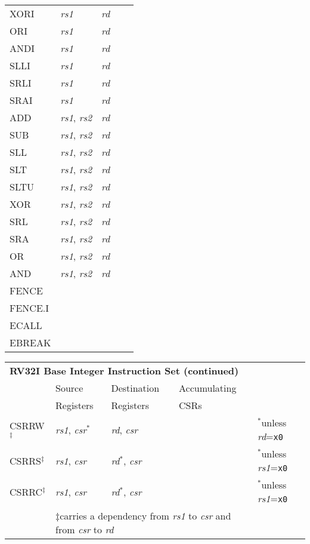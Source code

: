 \begin{tabular}{p{3cm}|p{3cm}|p{2cm}|p{4cm}|p{4cm}}
   \cline{2-4}
   XORI & {\em rs1} & {\em rd} &   & \\
   \cline{2-4}
   ORI & {\em rs1} & {\em rd} &   & \\
   \cline{2-4}
   ANDI & {\em rs1} & {\em rd} &   & \\
   \cline{2-4}
   SLLI & {\em rs1} & {\em rd} &   & \\
   \cline{2-4}
   SRLI & {\em rs1} & {\em rd} &   & \\
   \cline{2-4}
   SRAI & {\em rs1} & {\em rd} &   & \\
   \cline{2-4}
   ADD & {\em rs1}, {\em rs2} & {\em rd} &   & \\
   \cline{2-4}
   SUB & {\em rs1}, {\em rs2} & {\em rd} &   & \\
   \cline{2-4}
   SLL & {\em rs1}, {\em rs2} & {\em rd} &   & \\
   \cline{2-4}
   SLT & {\em rs1}, {\em rs2} & {\em rd} &   & \\
   \cline{2-4}
   SLTU & {\em rs1}, {\em rs2} & {\em rd} &   & \\
   \cline{2-4}
   XOR & {\em rs1}, {\em rs2} & {\em rd} &   & \\
   \cline{2-4}
   SRL & {\em rs1}, {\em rs2} & {\em rd} &   & \\
   \cline{2-4}
   SRA & {\em rs1}, {\em rs2} & {\em rd} &   & \\
   \cline{2-4}
   OR & {\em rs1}, {\em rs2} & {\em rd} &   & \\
   \cline{2-4}
   AND & {\em rs1}, {\em rs2} & {\em rd} &   & \\
   \cline{2-4}
   FENCE &  &  &   & \\
   \cline{2-4}
   FENCE.I &  &  &   & \\
   \cline{2-4}
   ECALL &  &  &   & \\
   \cline{2-4}
   EBREAK &  &  &   & \\
   \cline{2-4}
\end{tabular}

\begin{tabular}{p{3cm}|p{3cm}|p{2cm}|p{4cm}|p{4cm}}
  \multicolumn{4}{l}{\bf RV32I Base Integer Instruction Set (continued)} \\
  \cline{2-4}
   & Source    & Destination & Accumulating \\
   & Registers & Registers   & CSRs \\
  \cline{2-4}
   CSRRW$^\ddagger$ & {\em rs1}, {\em csr}$^*$ & {\em rd}, {\em csr} & & $^*$unless {\em rd}={\tt x0}  \\
   \cline{2-4}
   CSRRS$^\ddagger$ & {\em rs1}, {\em csr} & {\em rd}$^*$, {\em csr} & & $^*$unless {\em rs1}={\tt x0}  \\
   \cline{2-4}
   CSRRC$^\ddagger$ & {\em rs1}, {\em csr} & {\em rd}$^*$, {\em csr} & & $^*$unless {\em rs1}={\tt x0}  \\
   \cline{2-4}
   \multicolumn{1}{c}{} & \multicolumn{3}{l}{$\ddagger$carries a dependency from {\em rs1} to {\em csr} and from {\em csr} to {\em rd}}
\end{tabular}

